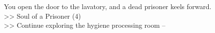 You open the door to the lavatory, and a dead prisoner keels forward.\\
>> Soul of a Prisoner (4)\\

>> Continue exploring the hygiene processing room -- 